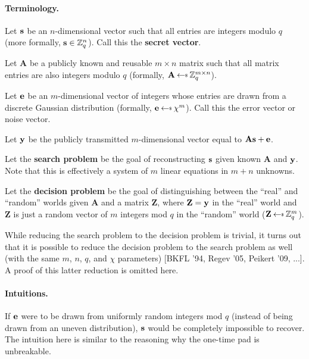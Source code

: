 \paragraph{Terminology.}
\begin{newitemize}
	\item
	Let $\mathbf{s}$ be an $n$-dimensional vector such that all entries are integers 
	modulo $q$ (more formally, $\mathbf{s} \in \mathbb{Z}^n_q$). Call this the 
	\textbf{secret vector}.

	\item
	Let $\textbf{A}$ be a publicly known and reusable $m \times n$ matrix such
	that all matrix entries are also integers modulo $q$ (formally, $\textbf{A}
	\getsr \mathbb{Z}^{m \times n}_q$).

	\item
	Let ${{\bf e}}$ be an $m$-dimensional vector of integers whose entries are drawn 
	from a discrete Gaussian distribution (formally, $\vece \getsr \chi^m$).
	Call this the error vector or noise vector.

	\item 
	Let ${{\bf y}}$ be the publicly transmitted $m$-dimensional vector equal to 
	$\textbf{A}\mathbf{s} + {{\bf e}}$.

	\item
	Let the \textbf{search problem} be the goal of reconstructing $\mathbf{s}$ given 
	known $\textbf{A}$ and ${{\bf y}}$. Note that this is effectively a system of
	$m$ linear equations in $m+n$ unknowns.

	\item 
	Let the \textbf{decision problem} be the goal of distinguishing between the 
	``real'' and ``random'' worlds given $\textbf{A}$ and a matrix $\textbf{Z}$, 
	where $\textbf{Z} = {{\bf y}}$ in the ``real'' world and $\textbf{Z}$ is just a 
	random vector of $m$ integers mod $q$ in the ``random'' world ($\textbf{Z} 
	\getsr \mathbb{Z}^m_q$).
\end{newitemize}

While reducing the search problem to the decision problem is trivial, it turns 
out that it is possible to reduce the decision problem to the search problem as 
well (with the same $m$, $n$, $q$, and $\chi$ parameters) [BKFL '94, Regev '05, 
Peikert '09, ...]. A proof of this latter reduction is omitted here. 

\paragraph{Intuitions.}
If ${{\bf e}}$ were to be drawn from uniformly random integers mod $q$ (instead of 
being drawn from an uneven distribution), $\mathbf{s}$ would be completely impossible 
to recover. The intuition here is similar to the reasoning why the one-time pad 
is unbreakable.

